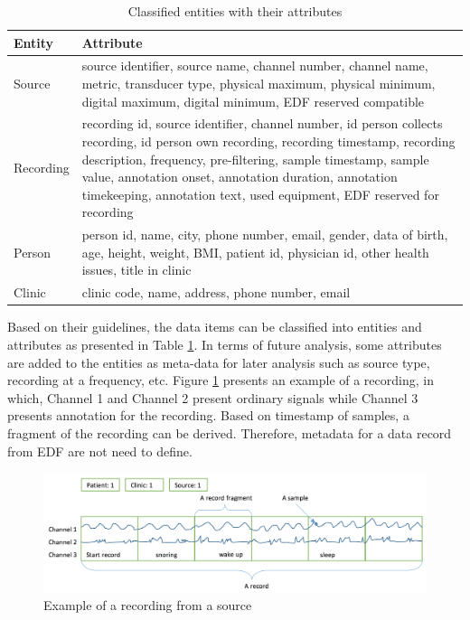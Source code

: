 \begin{table}
\begin{center}
\begin{tabular}{ |p{3cm}||p{10cm}|}
 \hline
 Entity& Attribute\\
 \hline
 Source& source identifier, source name, channel number, channel name, metric, transducer type, physical maximum, physical minimum, digital maximum, digital minimum, EDF reserved compatible\\
 \hline
 Recording& recording id, source identifier, channel number, id person collects recording, id person own recording, recording timestamp, recording description, frequency, pre-filtering, sample timestamp, sample value, annotation onset, annotation duration, annotation timekeeping, annotation text, used equipment, EDF reserved for recording\\
 \hline
 Person& person id, name, city, phone number, email, gender, data of birth, age, height, weight, BMI, patient id, physician id, other health issues, title in clinic\\
 \hline
 Clinic& clinic code, name, address, phone number, email\\
 \hline
\end{tabular}
\end{center}
\caption{Classified entities with their attributes}
\label{tab:entitiesAttributes}
\end{table}
Based on their guidelines, the data items can be classified into entities and attributes as presented in Table \ref{tab:entitiesAttributes}. In terms of future analysis, some attributes are added to the entities as meta-data for later analysis such as source type, recording at a frequency, etc. Figure \ref{fig:Figures/RecordingExample} presents an example of a recording, in which, Channel 1 and Channel 2 present ordinary signals while Channel 3 presents annotation for the recording. Based on timestamp of samples, a fragment of the recording can be derived. Therefore, metadata for a data record from EDF are not need to define.
\begin{figure}[ht]
    \centering
    \includegraphics[width=1.0\textwidth]{Figures/ARecord.png}
    \caption{Example of a recording from a source}
    \label{fig:Figures/RecordingExample}
\end{figure}
